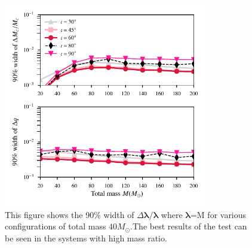 \documentclass[prl,preprintnumbers,twocolumn,eqsecnum,floatfix,a4paper,nofootinbib,superscriptaddress]{revtex4}
\newcommand{\blambda}{\bm{\lambda}}
\begin{document}
\begin{figure}[tbh]
	\includegraphics*[width=3.5in]{figs/fig3b.pdf}
	\caption{This figure shows the 90$\%$ width of $\Delta \blambda/\blambda$ where $\blambda$=M for various configurations of total mass $40M_{\odot}$.The best results of the test can be seen in the systems with high mass ratio.}
	\label{fig:dMc_dq_posteriors_gr}
\end{figure}
\end{document}
